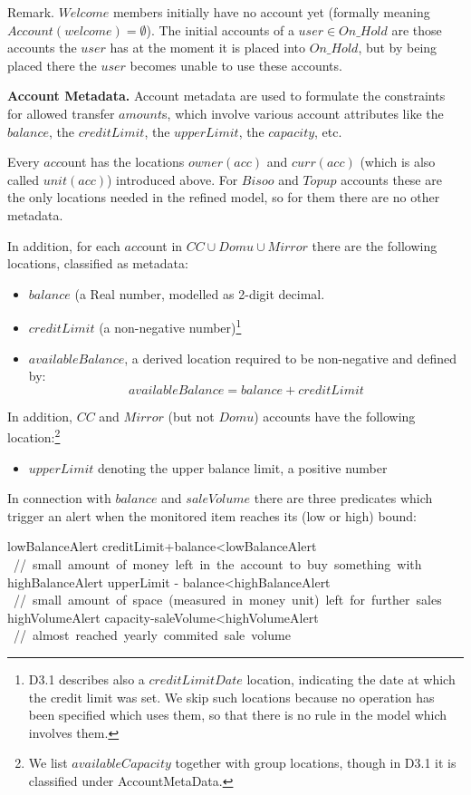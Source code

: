 Remark. $Welcome$ members initially have no account yet (formally meaning  $Account(welcome)=\emptyset$). The initial accounts of a 
$user \in On\_Hold$ are those accounts the $user$ has at the moment it is placed into $On\_Hold$, but by being placed there the $user$ becomes unable to use these accounts.

\bigskip
{\bf Account Metadata.} Account metadata are used to formulate the constraints for allowed transfer $amount$s, which involve various account attributes like the $balance$, the $creditLimit$, the $upperLimit$, the $capacity$, etc. 

Every $acc$ount has the locations $owner(acc)$ and $curr(acc)$ (which is also called $unit(acc)$) introduced above. For $Bisoo$ and $Topup$ accounts these are the only locations needed in the refined model, so for them there are no other metadata. 

In addition, for each $acc$ount in $CC \cup Domu \cup Mirror$ there are the following locations, classified as metadata:

\begin{itemize}
	\item $balance$ (a Real number, modelled as 2-digit decimal.
	
	\item $creditLimit$ (a non-negative number)\footnote{D3.1 describes also a $creditLimitDate$ location, indicating the date at which the credit limit was set. We skip such locations because no operation has been specified which uses them, so that there is no rule in the model which involves them.}
	
	\item $availableBalance$, a derived location required to be non-negative and defined by:
	\[availableBalance=balance+creditLimit\]
\end{itemize}

In addition, $CC$ and $Mirror$ (but not $Domu$) accounts have the following  location:\footnote{We list $availableCapacity$ together with group locations, though in D3.1 it is classified under AccountMetaData.}

\begin{itemize}
\item $upperLimit$ denoting the upper balance limit, a positive number
\end{itemize}

In connection with $balance$ and $saleVolume$ there are three predicates which trigger an alert when the monitored item reaches its (low or high) bound:
\begin{asm}
lowBalanceAlert \IFF creditLimit+balance<lowBalanceAlert \+
   \mbox{ // small amount of money left in the account to buy something with}\-
highBalanceAlert \IFF upperLimit - balance<highBalanceAlert \+
        \mbox{ // small amount of space (measured in money unit) left for further sales}\-
highVolumeAlert \IFF capacity-saleVolume<highVolumeAlert \+
           \mbox{ // almost reached yearly commited sale volume}
\end{asm}

